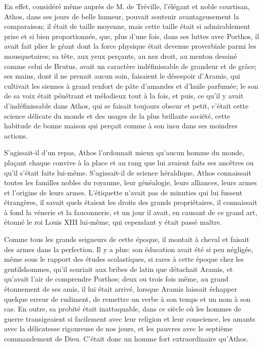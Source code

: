 En effet, considéré même auprès de M. de Tréville, l'élégant et noble courtisan, Athos, dans ses jours de belle humeur, pouvait soutenir avantageusement la comparaison; il était de taille moyenne, mais cette taille était si admirablement prise et si bien proportionnée, que, plus d'une fois, dans ses luttes avec Porthos, il avait fait plier le géant dont la force physique était devenue proverbiale parmi les mousquetaires; sa tête, aux yeux perçants, au nez droit, au menton dessiné comme celui de Brutus, avait un caractère indéfinissable de grandeur et de grâce; ses mains, dont il ne prenait aucun soin, faisaient le désespoir d'Aramis, qui cultivait les siennes à grand renfort de pâte d'amandes et d'huile parfumée; le son de sa voix était pénétrant et mélodieux tout à la fois, et puis, ce qu'il y avait d'indéfinissable dans Athos, qui se faisait toujours obscur et petit, c'était cette science délicate du monde et des usages de la plus brillante société, cette habitude de bonne maison qui perçait comme à son insu dans ses moindres actions. 

S'agissait-il d'un repas, Athos l'ordonnait mieux qu'aucun homme du monde, plaçant chaque convive à la place et au rang que lui avaient faits ses ancêtres ou qu'il s'était faits lui-même. S'agissait-il de science héraldique, Athos connaissait toutes les familles nobles du royaume, leur généalogie, leurs alliances, leurs armes et l'origine de leurs armes. L'étiquette n'avait pas de minuties qui lui fussent étrangères, il savait quels étaient les droits des grands propriétaires, il connaissait à fond la vénerie et la fauconnerie, et un jour il avait, en causant de ce grand art, étonné le roi Louis XIII lui-même, qui cependant y était passé maître. 

Comme tous les grands seigneurs de cette époque, il montait à cheval et faisait des armes dans la perfection. Il y a plus: son éducation avait été si peu négligée, même sous le rapport des études scolastiques, si rares à cette époque chez les gentilshommes, qu'il souriait aux bribes de latin que détachait Aramis, et qu'avait l'air de comprendre Porthos; deux ou trois fois même, au grand étonnement de ses amis, il lui était arrivé, lorsque Aramis laissait échapper quelque erreur de rudiment, de remettre un verbe à son temps et un nom à son cas. En outre, sa probité était inattaquable, dans ce siècle où les hommes de guerre transigeaient si facilement avec leur religion et leur conscience, les amants avec la délicatesse rigoureuse de nos jours, et les pauvres avec le septième commandement de Dieu. C'était donc un homme fort extraordinaire qu'Athos. 


